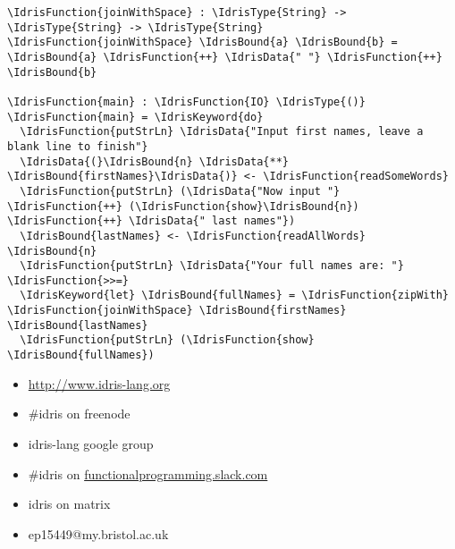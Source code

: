 \documentclass[xetex,xcolor={usenames,dvipsnames},mathserif,serif,17pt]{beamer}
\newcommand{\IdrisData}[1]{\textcolor{red}{#1}}
\newcommand{\IdrisType}[1]{\textcolor{blue}{#1}}
\newcommand{\IdrisBound}[1]{\textcolor{violet}{#1}}
\newcommand{\IdrisFunction}[1]{\textcolor{OliveGreen}{#1}}
\newcommand{\IdrisKeyword}[1]{{\underline{#1}}}
\begin{document}
\begin{frame}[fragile]
\begin{Verbatim}[commandchars=\\\{\}]
\IdrisFunction{joinWithSpace} : \IdrisType{String} -> \IdrisType{String} -> \IdrisType{String}
\IdrisFunction{joinWithSpace} \IdrisBound{a} \IdrisBound{b} = \IdrisBound{a} \IdrisFunction{++} \IdrisData{" "} \IdrisFunction{++} \IdrisBound{b}

\IdrisFunction{main} : \IdrisFunction{IO} \IdrisType{()}
\IdrisFunction{main} = \IdrisKeyword{do}
  \IdrisFunction{putStrLn} \IdrisData{"Input first names, leave a blank line to finish"}
  \IdrisData{(}\IdrisBound{n} \IdrisData{**} \IdrisBound{firstNames}\IdrisData{)} <- \IdrisFunction{readSomeWords}
  \IdrisFunction{putStrLn} (\IdrisData{"Now input "} \IdrisFunction{++} (\IdrisFunction{show}\IdrisBound{n}) \IdrisFunction{++} \IdrisData{" last names"})
  \IdrisBound{lastNames} <- \IdrisFunction{readAllWords} \IdrisBound{n}
  \IdrisFunction{putStrLn} \IdrisData{"Your full names are: "} \IdrisFunction{>>=}
  \IdrisKeyword{let} \IdrisBound{fullNames} = \IdrisFunction{zipWith} \IdrisFunction{joinWithSpace} \IdrisBound{firstNames} \IdrisBound{lastNames}
  \IdrisFunction{putStrLn} (\IdrisFunction{show} \IdrisBound{fullNames})
\end{Verbatim}
\end{frame}

\fontsize{16}{16}\selectfont

\begin{frame}[fragile]
  \begin{itemize}
  \item \url{http://www.idris-lang.org}
  \item \#idris on freenode
  \item idris-lang google group
  \item \#idris on \url{functionalprogramming.slack.com}
  \item idris on matrix
  \item ep15449@my.bristol.ac.uk
  \end{itemize}
\end{frame}
\end{document}
